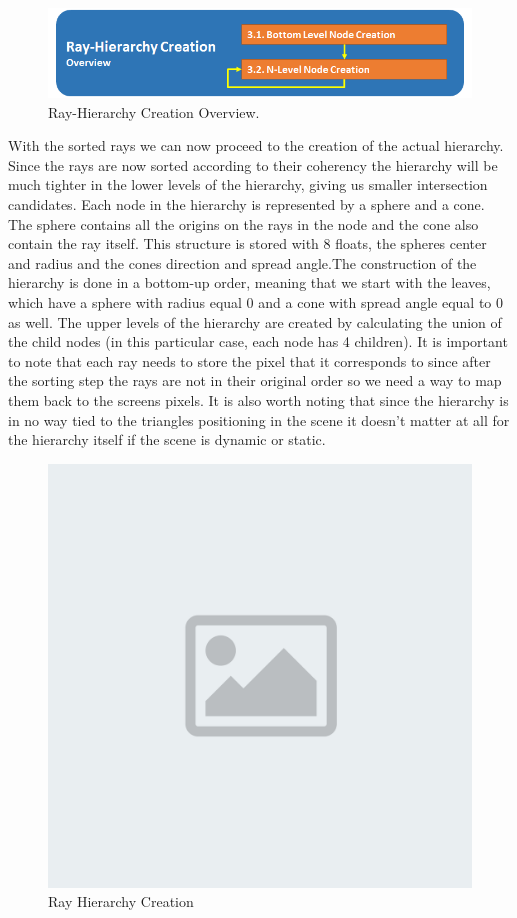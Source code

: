 \documentclass{llncs}
\begin{document}
\begin{figure}
\centering
\includegraphics[scale=0.60]{images/figure 4.png}
\caption{Ray-Hierarchy Creation Overview.}
\end{figure}

With the sorted rays we can now proceed to the creation of the actual hierarchy. Since the rays are now sorted according to their coherency the hierarchy will be much tighter in the lower levels of the hierarchy, giving us smaller intersection candidates.
Each node in the hierarchy is represented by a sphere and a cone. The sphere contains all the origins on the rays in the node and the cone also contain the ray itself. This structure  is stored with 8 floats, the spheres center and radius and the cones direction and spread angle.The construction of the hierarchy is done in a bottom-up order, meaning that we start with the leaves, which have a sphere with radius equal 0 and a cone with spread angle equal to 0 as well. The upper levels of the hierarchy are created by calculating the union of the child nodes (in this particular case, each node has 4 children). It is important to note that each ray needs to store the pixel that it corresponds to since after the sorting step the rays are not in their original order so we need a way to map them back to the screens pixels. It is also worth noting that since the hierarchy is in no way tied to the triangles positioning in the scene it doesn't matter at all for the hierarchy itself  if the scene is dynamic or static.

\begin{figure}
\centering
\includegraphics[scale=0.070]{images/placeholder.png}
\caption{Ray Hierarchy Creation}
\end{figure}
\end{document}
